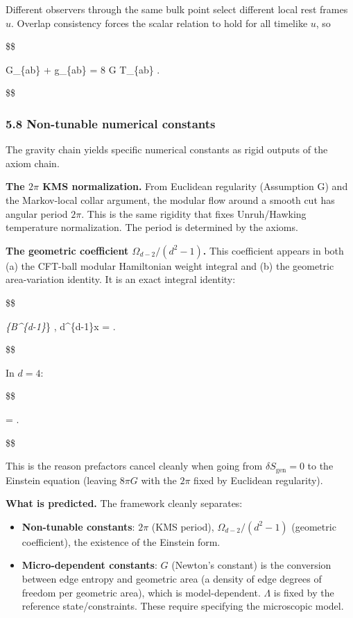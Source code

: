 \documentclass[11pt,a4paper]{article}
\theoremstyle{remark}
\providecommand{\tightlist}{%
  \setlength{\itemsep}{0pt}\setlength{\parskip}{0pt}}
\begin{document}
Different observers through the same bulk point select different local rest
frames \(u\). Overlap consistency forces the scalar relation to hold for all
timelike \(u\), so

\$\$

G\_\{ab\} + \Lambda g\_\{ab\} = 8 \pi G \langle T\_\{ab\} \rangle.

\$\$

\subsubsection{5.8 Non-tunable numerical constants}\label{non-tunable-numerical-constants}

The gravity chain yields specific numerical constants as rigid outputs of
the axiom chain.

\textbf{The \(2\pi\) KMS normalization.} From Euclidean regularity (Assumption G)
and the Markov-local collar argument, the modular flow around a smooth cut
has angular period \(2\pi\). This is the same rigidity that fixes Unruh/Hawking
temperature normalization. The period is determined by the axioms.

\textbf{The geometric coefficient \(\Omega_{d-2}/(d^2 - 1)\).} This coefficient
appears in both (a) the CFT-ball modular Hamiltonian weight integral and
(b) the geometric area-variation identity. It is an exact integral identity:

\$\$

\int\emph{\{B\^{}\{d-1\}}\ell\}  , d\^{}\{d-1\}x
= .

\$\$

In \(d = 4\):

\$\$

 =  .

\$\$

This is the reason prefactors cancel cleanly when going from
\(\delta S_{\mathrm{gen}} = 0\) to the Einstein equation (leaving \(8\pi G\)
with the \(2\pi\) fixed by Euclidean regularity).

\textbf{What is predicted.} The framework cleanly separates:

\begin{itemize}
\tightlist
\item
  \textbf{Non-tunable constants}: \(2\pi\) (KMS period), \(\Omega_{d-2}/(d^2-1)\)
  (geometric coefficient), the existence of the Einstein form.
\item
  \textbf{Micro-dependent constants}: \(G\) (Newton's constant) is the conversion
  between edge entropy and geometric area (a density of edge degrees of
  freedom per geometric area), which is model-dependent. \(\Lambda\) is fixed
  by the reference state/constraints. These require specifying the
  microscopic model.
\end{itemize}
\end{document}
